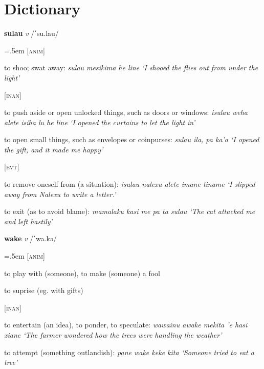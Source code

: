 \part{Dictionary}

\begin{multicols*}{2}
  \setlength{\parskip}{.25em}
  \textbf{sulau} \textit{v} /ˈsu.lau/

\begin{hangparas}{.5em}{1}
\leftskip=.5em
  {\color{groupcolor}\textsc{[anim]}}

  to shoo; swat away: \textit{sulau me\-sikima he line `I shoo\-ed the flies out from under the light'}

  {\color{groupcolor}\textsc{[inan]}}

  to push aside or open unlocked things, such as doors or windows: \textit{isulau weha alete isiha lu he line `I opened the curtains to let the light in'}

  to open small things, such as envelopes or coinpurses: \textit{sulau ila, pa ka'a `I opened the gift, and it made me happy'}

  {\color{groupcolor}\textsc{[evt]}}

  to remove oneself from (a situation): \textit{isulau nalexu alete imane tiname `I slipped away from Nalexu to write a letter.'}

  to exit (as to avoid blame): \textit{mamalaku kasi me pa ta sulau `The cat attacked me and left hastily'}
 \end{hangparas}

\textbf{wake} \textit{v} /ˈwa.kə/

\begin{hangparas}{.5em}{1}
\leftskip=.5em
  {\color{groupcolor}\textsc{[anim]}}

to play with (someone), to make (someone) a fool

to suprise (eg. with gifts)

  {\color{groupcolor}\textsc{[inan]}}

to entertain (an idea), to ponder, to speculate: \textit{wawainu awake mekita 'e hasi xiane `The farmer wondered how the trees were handling the weather'}

to attempt (something outlandish): \textit{pane wake keke kita `Someone tried to eat a tree'}

\end{hangparas}


\end{multicols*}